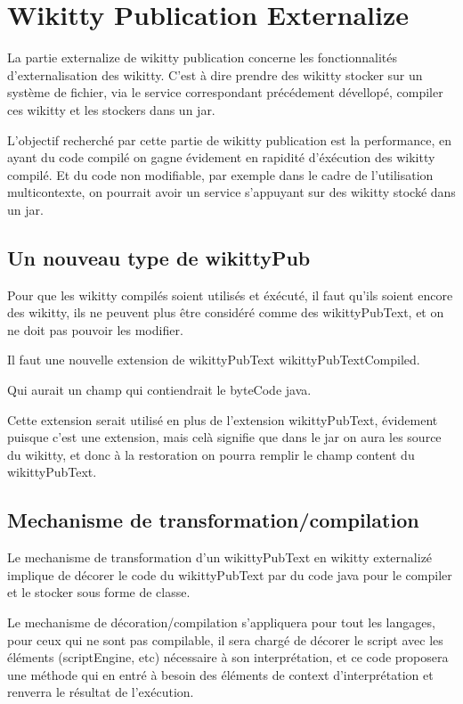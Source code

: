 \section{Wikitty Publication Externalize}

La partie externalize de wikitty publication concerne les fonctionnalités 
d'externalisation des wikitty. C'est à dire prendre des wikitty stocker sur un 
système de fichier, via le service correspondant précédement dévellopé, compiler
ces wikitty et les stockers dans un jar.

L'objectif recherché par cette partie de wikitty publication est la performance,
en ayant du code compilé on gagne évidement en rapidité d'éxécution des wikitty
compilé. Et du code non modifiable, par exemple dans le cadre de l'utilisation 
multicontexte, on pourrait avoir un service s'appuyant sur des wikitty stocké 
dans un jar.



\subsection{Un nouveau type de wikittyPub}

Pour que les wikitty compilés soient utilisés et éxécuté, il faut qu'ils soient
encore des wikitty, ils ne peuvent plus être considéré comme des wikittyPubText,
et on ne doit pas pouvoir les modifier.

Il faut une nouvelle extension de wikittyPubText wikittyPubTextCompiled.

Qui aurait un champ qui contiendrait le byteCode java.

Cette extension serait utilisé en plus de l'extension wikittyPubText, évidement
puisque c'est une extension, mais celà signifie que dans le jar on aura les 
source du wikitty, et donc à la restoration on pourra remplir le champ content 
du wikittyPubText.

\subsection{Mechanisme de transformation/compilation}

Le mechanisme de transformation d'un wikittyPubText en wikitty externalizé 
implique de décorer le code du wikittyPubText par du code java pour le compiler 
et le stocker sous forme de classe.

Le mechanisme de décoration/compilation s'appliquera pour tout les langages, 
pour ceux qui ne sont pas compilable, il sera chargé de décorer le script
avec les éléments (scriptEngine, etc) nécessaire à son interprétation,
et ce code proposera une méthode qui en entré à besoin des éléments de context
d'interprétation et renverra le résultat de l'exécution.

